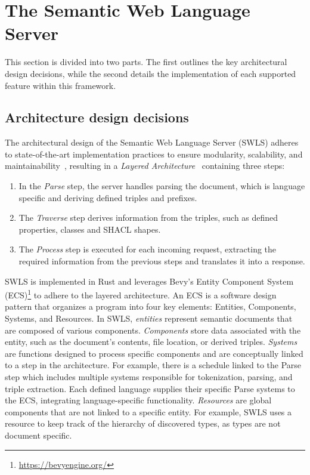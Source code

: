 \section{The Semantic Web Language Server}%
\label{sec:semantic_lsp}

This section is divided into two parts. The first outlines the key architectural design decisions, while the second details the implementation of each supported feature within this framework.

\subsection{Architecture design decisions}

The architectural design of the Semantic Web Language Server (SWLS) adheres to state-of-the-art implementation practices to ensure modularity, scalability, and maintainability~\cite{10.1145/3550355.3552452,10.1145/3563834.3567537,10.1145/3550355.3552452,Bour_2018}, resulting in a \textit{Layered Architecture}~\cite{10.1145/3550355.3552452} containing three steps:

\begin{enumerate}
  \item In the \textit{Parse} step, the server handles parsing the document, which is language specific and deriving defined triples and prefixes.

  \item The \textit{Traverse} step derives information from the triples, such as defined properties, classes and SHACL shapes. 

  \item The \textit{Process} step is executed for each incoming request, extracting the required information from the previous steps and translates it into a response.
\end{enumerate}

SWLS is implemented in Rust and leverages Bevy’s Entity Component System (ECS)\footnote{\url{https://bevyengine.org/}} to adhere to the layered architecture.
An ECS is a software design pattern that organizes a program into four key elements: Entities, Components, Systems, and Resources. 
In SWLS, \textit{entities} represent semantic documents that are composed of various components. 
\textit{Components} store data associated with the entity, such as the document's contents, file location, or derived triples. 
\textit{Systems} are functions designed to process specific components and are conceptually linked to a step in the architecture. 
For example, there is a schedule linked to the Parse step which includes multiple systems responsible for tokenization, parsing, and triple extraction.
Each defined language supplies their specific Parse systems to the ECS, integrating language-specific functionality.
\textit{Resources} are global components that are not linked to a specific entity.
For example, SWLS uses a resource to keep track of the hierarchy of discovered types, as types are not document specific.

